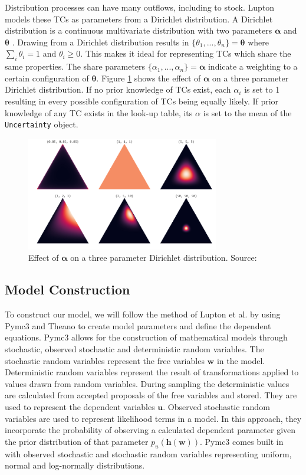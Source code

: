 \documentclass[ %
                    author={Tom Jager},
                supervisor={Dr. Daniel Schien},
                    degree={MEng},
                     title={A Bayesian Inference Engine for Calibrating Uncertainty over UMIS Structured MFA Systems},
                  subtitle={},
                      type={research},
                      year={2019} ]{dissertation}
\begin{document}
Distribution processes can have many outflows, including to stock. Lupton models these TCs as parameters from a Dirichlet distribution. A Dirichlet distribution is a continuous multivariate distribution with two parameters $\bm{\alpha}$ and $\bm{\theta}$ \cite{dirichlet}. Drawing from a Dirichlet distribution results in $\{\theta_1, ..., \theta_n\} = \bm{\theta}$ where $\sum_{i}\theta_i = 1$ and $\theta_i \ge 0$. This makes it ideal for representing TCs which share the same properties. The share parameters $\{\alpha_1, ..., \alpha_n\} = \bm{\alpha}$ indicate a weighting to a certain configuration of $\bm{\theta}$. Figure \ref{fig:dirichlet} shows the effect of $\bm{\alpha}$ on a three parameter Dirichlet distribution. If no prior knowledge of TCs exist, each $\alpha_i$ is set to 1 resulting in every possible configuration of TCs being equally likely. If prior knowledge of any TC exists in the look-up table, its $\alpha$ is set to the mean of the \texttt{Uncertainty} object.

\begin{figure}
    \centering
    \includegraphics[width=0.75\textwidth]{images/dirichlet.png}
    \caption{Effect of $\bm{\alpha}$ on a three parameter Dirichlet distribution. Source: \cite{dirichlet}}
    \label{fig:dirichlet}
\end{figure}

\subsection{Model Construction}
\label{sec:model_construction}
To construct our model, we will follow the method of Lupton et al. by using Pymc3 and Theano to create model parameters and define the dependent equations. Pymc3 allows for the construction of mathematical models through stochastic, observed stochastic and deterministic random variables. The stochastic random variables represent the free variables $\bm{w}$ in the model. Deterministic random variables represent the result of transformations applied to values drawn from random variables. During sampling the deterministic values are calculated from accepted proposals of the free variables and stored. They are used to represent the dependent variables $\bm{u}$. Observed stochastic random variables are used to represent likelihood terms in a model. In this approach, they incorporate the probability of observing a calculated dependent parameter given the prior distribution of that parameter $p_u(\bm{h}(\bm{w}))$. Pymc3 comes built in with observed stochastic and stochastic random variables representing uniform, normal and log-normally distributions.
\end{document}
